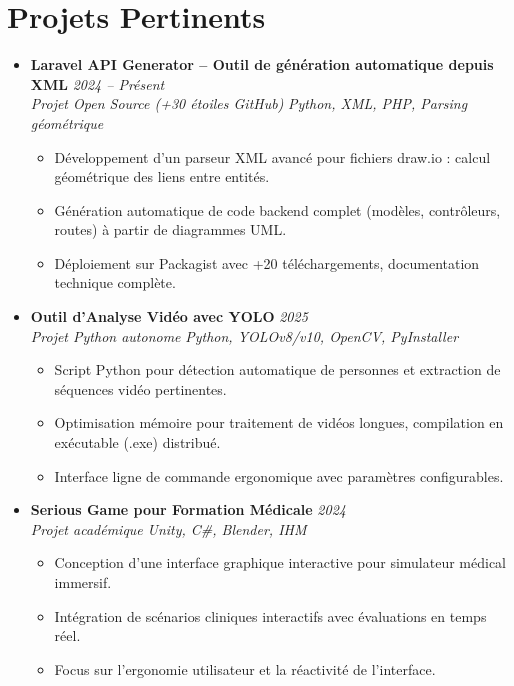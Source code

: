 \documentclass[a4paper,11pt]{article}
\begin{document}
\section{Projets Pertinents}
\begin{itemize}[leftmargin=*, label={-}]

\item \textbf{Laravel API Generator -- Outil de génération automatique depuis XML} \hfill \textit{2024 -- Présent} \\
\textit{Projet Open Source (+30 étoiles GitHub)} \hfill \textit{Python, XML, PHP, Parsing géométrique}
\vspace{-2pt}
    \begin{itemize}[leftmargin=0.4cm, nosep, label=\tiny$\bullet$]
        \item \small{Développement d'un parseur XML avancé pour fichiers draw.io : calcul géométrique des liens entre entités.}
        \item \small{Génération automatique de code backend complet (modèles, contrôleurs, routes) à partir de diagrammes UML.}
        \item \small{Déploiement sur Packagist avec +20 téléchargements, documentation technique complète.}
    \end{itemize}
\vspace{3pt}

\item \textbf{Outil d'Analyse Vidéo avec YOLO} \hfill \textit{2025} \\
\textit{Projet Python autonome} \hfill \textit{Python, YOLOv8/v10, OpenCV, PyInstaller}
\vspace{-2pt}
    \begin{itemize}[leftmargin=0.4cm, nosep, label=\tiny$\bullet$]
        \item \small{Script Python pour détection automatique de personnes et extraction de séquences vidéo pertinentes.}
        \item \small{Optimisation mémoire pour traitement de vidéos longues, compilation en exécutable (.exe) distribué.}
        \item \small{Interface ligne de commande ergonomique avec paramètres configurables.}
    \end{itemize}
\vspace{3pt}

\item \textbf{Serious Game pour Formation Médicale} \hfill \textit{2024} \\
\textit{Projet académique} \hfill \textit{Unity, C\#, Blender, IHM}
\vspace{-2pt}
    \begin{itemize}[leftmargin=0.4cm, nosep, label=\tiny$\bullet$]
        \item \small{Conception d'une interface graphique interactive pour simulateur médical immersif.}
        \item \small{Intégration de scénarios cliniques interactifs avec évaluations en temps réel.}
        \item \small{Focus sur l'ergonomie utilisateur et la réactivité de l'interface.}
    \end{itemize}
\vspace{3pt}


\end{itemize}
\end{document}
